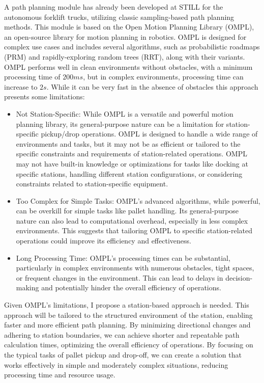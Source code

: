 A path planning module has already been developed at STILL for the autonomous 
forklift trucks, utilizing classic sampling-based path planning methods. This module is based on the Open Motion 
Planning Library (OMPL), an open-source library for motion planning in robotics. OMPL is designed for complex use 
cases and includes several algorithms, such as probabilistic roadmaps (PRM) and rapidly-exploring random trees 
(RRT), along with their variants. OMPL performs well in clean environments without obstacles, with a minimum 
processing time of \(200ms\), but in complex environments, processing time can increase to \(2s\).
While it can be very fast in the absence of obstacles this approach presents some limitations:
\begin{itemize}
    \item Not Station-Specific: While OMPL is a versatile and powerful motion planning library, its general-purpose 
    nature can be a limitation for station-specific pickup/drop operations. OMPL is designed to handle a wide range 
    of environments and tasks, but it may not be as efficient or tailored to the specific constraints and 
    requirements of station-related operations. OMPL may not have built-in knowledge or optimizations for tasks 
    like docking at specific stations, handling different station configurations, or considering constraints 
    related to station-specific equipment.

    \item Too Complex for Simple Tasks: OMPL's advanced algorithms, while powerful, can be overkill for simple tasks 
    like pallet handling. Its general-purpose nature can also lead to computational overhead, 
    especially in less complex environments. This suggests that tailoring OMPL to specific station-related 
    operations could improve its efficiency and effectiveness.
    
    \item Long Processing Time: OMPL's processing times can be substantial, particularly in complex environments 
    with numerous obstacles, tight spaces, or frequent changes in the environment. 
    This can lead to delays in decision-making and potentially hinder the overall efficiency of operations. 
\end{itemize}

Given OMPL's limitations, I propose a station-based approach is needed. This approach will be tailored 
to the structured environment of the station, enabling faster and more efficient path planning. 
By minimizing directional changes and adhering to station boundaries, we can achieve shorter and repeatable 
path calculation times, optimizing the overall efficiency of operations. By focusing on the typical tasks of pallet 
pickup and drop-off, we can create a solution that works effectively in simple and moderately complex 
situations, reducing processing time and resource usage. 

